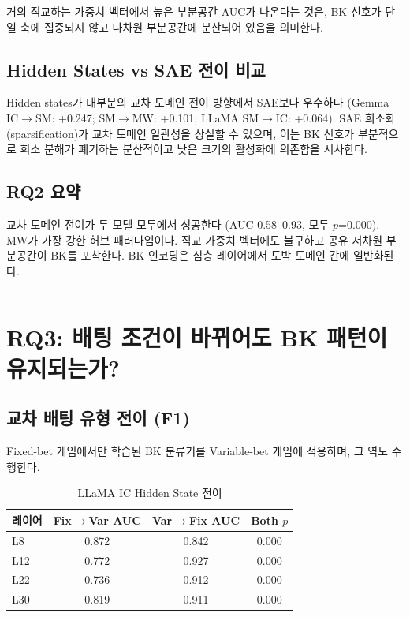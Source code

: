 \documentclass[11pt,a4paper]{article}
\begin{document}
거의 직교하는 가중치 벡터에서 높은 부분공간 AUC가 나온다는 것은, BK 신호가 단일 축에 집중되지 않고 다차원 부분공간에 분산되어 있음을 의미한다.

\subsection{Hidden States vs SAE 전이 비교}

Hidden states가 대부분의 교차 도메인 전이 방향에서 SAE보다 우수하다 (Gemma IC$\rightarrow$SM: +0.247; SM$\rightarrow$MW: +0.101; LLaMA SM$\rightarrow$IC: +0.064). SAE 희소화(sparsification)가 교차 도메인 일관성을 상실할 수 있으며, 이는 BK 신호가 부분적으로 희소 분해가 폐기하는 분산적이고 낮은 크기의 활성화에 의존함을 시사한다.

\subsection{RQ2 요약}

교차 도메인 전이가 두 모델 모두에서 성공한다 (AUC 0.58--0.93, 모두 $p$=0.000). MW가 가장 강한 허브 패러다임이다. 직교 가중치 벡터에도 불구하고 공유 저차원 부분공간이 BK를 포착한다. BK 인코딩은 심층 레이어에서 도박 도메인 간에 일반화된다.

\bigskip\hrule\bigskip

\section{RQ3: 배팅 조건이 바뀌어도 BK 패턴이 유지되는가?}

\subsection{교차 배팅 유형 전이 (F1)}

Fixed-bet 게임에서만 학습된 BK 분류기를 Variable-bet 게임에 적용하며, 그 역도 수행한다.

\begin{table}[H]
\centering
\caption{LLaMA IC Hidden State 전이}
\begin{tabular}{lccc}
\toprule
\textbf{레이어} & \textbf{Fix$\rightarrow$Var AUC} & \textbf{Var$\rightarrow$Fix AUC} & \textbf{Both $p$} \\
\midrule
L8 & 0.872 & 0.842 & 0.000 \\
L12 & 0.772 & 0.927 & 0.000 \\
L22 & 0.736 & 0.912 & 0.000 \\
L30 & 0.819 & 0.911 & 0.000 \\
\bottomrule
\end{tabular}
\end{table}
\end{document}
